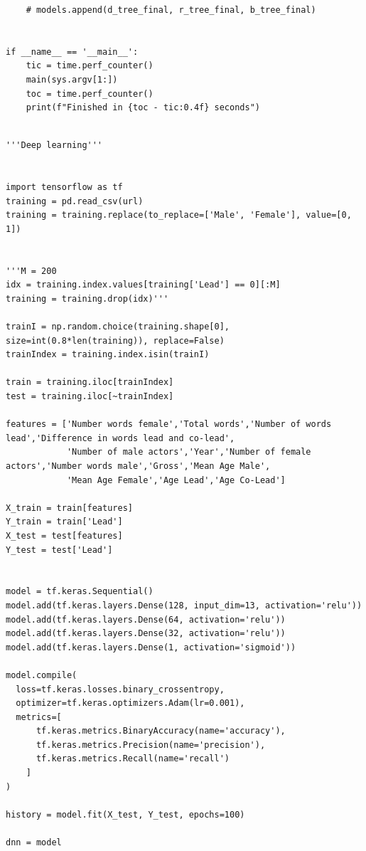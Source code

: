 \documentclass{article}
\begin{document}
\begin{verbatim}
    # models.append(d_tree_final, r_tree_final, b_tree_final)


if __name__ == '__main__':
    tic = time.perf_counter()
    main(sys.argv[1:])
    toc = time.perf_counter()
    print(f"Finished in {toc - tic:0.4f} seconds")


\end{verbatim}
 


\begin{verbatim}
'''Deep learning'''


import tensorflow as tf
training = pd.read_csv(url)
training = training.replace(to_replace=['Male', 'Female'], value=[0, 1])


'''M = 200
idx = training.index.values[training['Lead'] == 0][:M]
training = training.drop(idx)'''

trainI = np.random.choice(training.shape[0], size=int(0.8*len(training)), replace=False)
trainIndex = training.index.isin(trainI)

train = training.iloc[trainIndex]
test = training.iloc[~trainIndex]

features = ['Number words female','Total words','Number of words lead','Difference in words lead and co-lead',
            'Number of male actors','Year','Number of female actors','Number words male','Gross','Mean Age Male',
            'Mean Age Female','Age Lead','Age Co-Lead']

X_train = train[features]
Y_train = train['Lead']
X_test = test[features]
Y_test = test['Lead']


model = tf.keras.Sequential()
model.add(tf.keras.layers.Dense(128, input_dim=13, activation='relu')) 
model.add(tf.keras.layers.Dense(64, activation='relu'))
model.add(tf.keras.layers.Dense(32, activation='relu')) 
model.add(tf.keras.layers.Dense(1, activation='sigmoid'))

model.compile(
  loss=tf.keras.losses.binary_crossentropy,
  optimizer=tf.keras.optimizers.Adam(lr=0.001),
  metrics=[
      tf.keras.metrics.BinaryAccuracy(name='accuracy'),
      tf.keras.metrics.Precision(name='precision'),
      tf.keras.metrics.Recall(name='recall')
    ]
)

history = model.fit(X_test, Y_test, epochs=100)

dnn = model

\end{verbatim}
\end{document}
